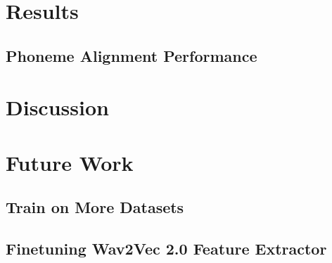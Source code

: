 \documentclass[letterpaper, 12pt]{article}
\begin{document}
\begin{multicols*}{2}

\section{Results}


\subsection{Phoneme Alignment Performance}


\section{Discussion}

\section{Future Work}
\subsection{Train on More Datasets}
\subsection{Finetuning Wav2Vec 2.0 Feature Extractor}

\end{multicols*}
\end{document}
